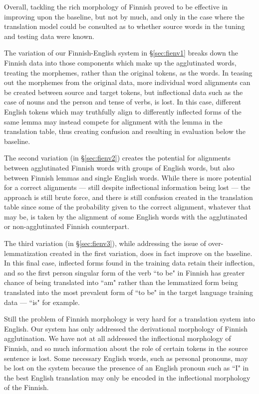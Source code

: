 \documentclass[11pt,a4paper]{article}
\begin{document}
Overall, tackling the rich morphology of Finnish proved to be effective in improving upon the baseline, but not by much, and only in the case where the translation model could be consulted as to whether source words in the tuning and testing data were known. 

The variation of our Finnish-English system in \S\ref{sec:fienv1} breaks down the Finnish data into those components which make up the agglutinated words, treating the morphemes, rather than the original tokens, as the words.  
%
In teasing out the morphemes from the original data, more individual word alignments can be created between source and target tokens, but inflectional data such as the case of nouns and the person and tense of verbs, is lost.
%
In this case, different English tokens which may truthfully align to differently inflected forms of the same lemma may instead compete for alignment with the lemma in the translation table, thus creating confusion and resulting in evaluation below the baseline.

The second variation (in \S\ref{sec:fienv2}) creates the potential for alignments between agglutinated Finnish words with groups of English words, but also between Finnish lemmas and single English words.
%
While there is more potential for a correct alignments --- still despite inflectional information being lost --- the approach is still brute force, and there is still confusion created in the translation table since some of the probability given to the correct alignment, whatever that may be, is taken by the alignment of some English words with the agglutinated or non-agglutinated Finnish counterpart.

The third variation (in \S\ref{sec:fienv3}), while addressing the issue of over-lemmatization created in the first variation, does in fact improve on the baseline.
%
In this final case, inflected forms found in the training data retain their inflection, and so the first person singular form of the verb ``to be" in Finnish has greater chance of being translated into ``am" rather than the lemmatized form being translated into the most prevalent form of ``to be" in the target language training data --- ``is" for example.

Still the problem of Finnish morphology is very hard for a translation system into English.
%
Our system has only addressed the derivational morphology of Finnish agglutination.
%
We have not at all addressed the inflectional morphology of Finnish, and so much information about the role of certain tokens in the source sentence is lost.
%
Some necessary English words, such as personal pronouns, may be lost on the system because the presence of an English pronoun such as ``I" in the best English translation may only be encoded in the inflectional morphology of the Finnish.
\end{document}
